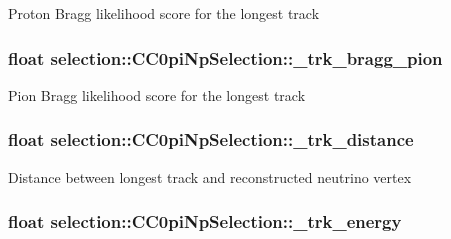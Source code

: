 Proton Bragg likelihood score for the longest track \hypertarget{classselection_1_1CC0piNpSelection_a5371981bb5f02024c2ba1d986541ffd9}{
\subsubsection[{\-\_\-trk\-\_\-bragg\-\_\-pion}]{\setlength{\rightskip}{0pt plus 5cm}float selection\-::\-C\-C0pi\-Np\-Selection\-::\-\_\-trk\-\_\-bragg\-\_\-pion\hspace{0.3cm}{\ttfamily [private]}}}\label{classselection_1_1CC0piNpSelection_a5371981bb5f02024c2ba1d986541ffd9}
Pion Bragg likelihood score for the longest track \hypertarget{classselection_1_1CC0piNpSelection_a0f16777192fbed04bcc67edfdfa67e6b}{
\subsubsection[{\-\_\-trk\-\_\-distance}]{\setlength{\rightskip}{0pt plus 5cm}float selection\-::\-C\-C0pi\-Np\-Selection\-::\-\_\-trk\-\_\-distance\hspace{0.3cm}{\ttfamily [private]}}}\label{classselection_1_1CC0piNpSelection_a0f16777192fbed04bcc67edfdfa67e6b}
Distance between longest track and reconstructed neutrino vertex \hypertarget{classselection_1_1CC0piNpSelection_a98e03f33f34b5df397a1d1144b1de4a1}{
\subsubsection[{\-\_\-trk\-\_\-energy}]{\setlength{\rightskip}{0pt plus 5cm}float selection\-::\-C\-C0pi\-Np\-Selection\-::\-\_\-trk\-\_\-energy\hspace{0.3cm}{\ttfamily [private]}}}\label{classselection_1_1CC0piNpSelection_a98e03f33f34b5df397a1d1144b1de4a1}
